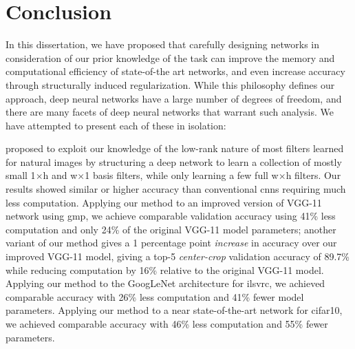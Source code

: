\documentclass[thesis]{subfiles}
\begin{document}

\chapter{Conclusion}
\label{conclusion}
In this dissertation, we have proposed that carefully designing networks in consideration of our prior knowledge of the task can improve the memory and computational efficiency of state-of-the art networks, and even increase accuracy through structurally induced regularization. While this philosophy defines our approach, deep neural networks have a large number of degrees of freedom, and there are many facets of deep neural networks that warrant such analysis. We have attempted to present each of these in isolation:

 proposed to exploit our knowledge of the low-rank nature of most filters learned for natural images by structuring a deep network to learn a collection of mostly small 1$\times$h and w$\times$1 basis filters, while only learning a few full w$\times$h filters. Our results showed similar or higher accuracy than conventional \glspl{cnn} requiring much less computation. Applying our method to an improved version of VGG-11 network using \gls{gmp}, we achieve comparable validation accuracy using 41\% less computation and only 24\% of the original VGG-11 model parameters; another variant of our method gives a 1 percentage point {\em increase} in accuracy over our improved VGG-11 model, giving a top-5 \emph{center-crop} validation accuracy of 89.7\% while reducing computation by 16\% relative to the original VGG-11 model. Applying our method to the GoogLeNet architecture for \gls{ilsvrc}, we achieved comparable accuracy with 26\% less computation and 41\% fewer model parameters. Applying our method to a near state-of-the-art network for \gls{cifar10}, we achieved comparable accuracy with 46\% less computation and 55\% fewer parameters. 
	
\end{document}
